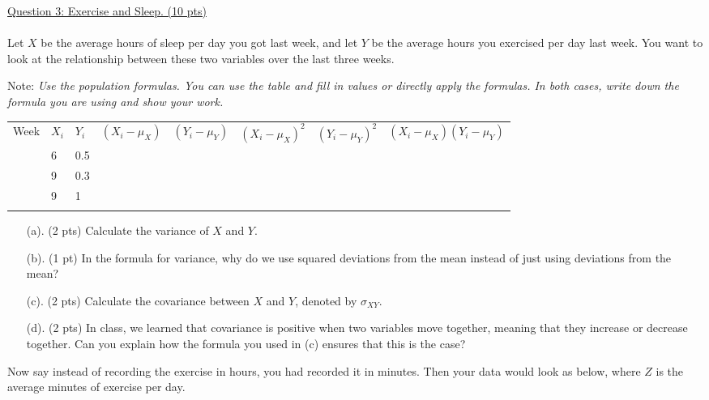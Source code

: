 \documentclass{./../../Latex/tests}
\begin{document}
\newpage
\underline{Question 3: Exercise and Sleep. (10 pts)} \\~\\
Let $X$ be the average hours of sleep per day you got last week, and let $Y$ be the average hours you exercised per day last week. You want to look at the relationship between these two variables over the last three weeks.

Note: \textit{Use the population formulas. You can use the table and fill in values or directly apply the formulas. In both cases, write down the formula you are using and show your work.} 

\begin{tabularx}{1.1\textwidth}{P{1cm}P{0.75cm}P{0.75cm}P{1.75cm}P{1.75cm}P{1.85cm}P{1.75cm}Y}
\hline \addlinespace[0.5em]
Week & $X_i$ & $Y_i$ & $(X_i-\mu_X)$ & $(Y_i-\mu_Y)$ & $(X_i-\mu_X)^2$ & $(Y_i-\mu_Y)^2$ & $(X_i-\mu_X)(Y_i-\mu_Y)$  \\ \addlinespace[0.5em] \hline {} & 6 & 0.5 &  &  &  &  &  \\ \hline {} & 9 & 0.3 &  &  &  &  &  \\ \hline {} & 9 & 1 &  &  &  &  &  \\ \hline \addlinespace[0.5em]
 \\ \hline
\end{tabularx}


\begin{enumerate}
\item[(a).] (2 pts) Calculate the variance of $X$ and $Y$. 
\vspace{6cm}
\item[(b).] (1 pt) In the formula for variance, why do we use squared deviations from the mean instead of just using deviations from the mean? 
\newpage
\item[(c).] (2 pts) Calculate the covariance between $X$ and $Y$, denoted by $\sigma_{XY}$. 
\vspace{6.25cm}
\item[(d).] (2 pts) In class, we learned that covariance is positive when two variables move together, meaning that they increase or decrease together. Can you explain how the formula you used in (c) ensures that this is the case?
\vspace{6.25cm}
\end{enumerate}

Now say instead of recording the exercise in hours, you had recorded it in minutes. Then your data would look as below, where $Z$ is the average minutes of exercise per day. \\
\end{document}
